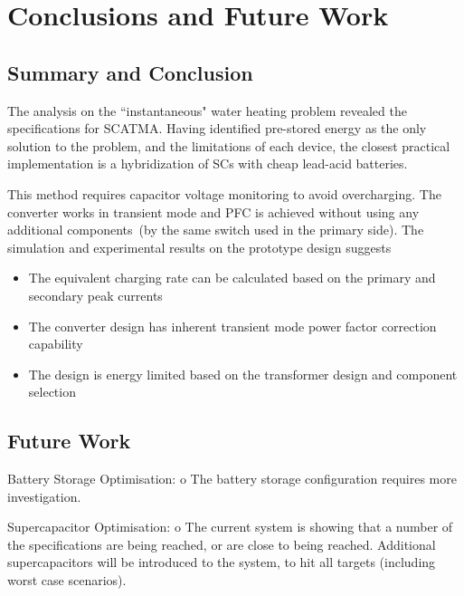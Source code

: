 \chapter{\textbf{Conclusions and Future Work}}
\label{ch:conclude_future}

\section{Summary and Conclusion}

The analysis on the ``instantaneous" water heating problem revealed the specifications for SCATMA.
\noindent Having identified pre-stored energy as the only solution to the problem, and the limitations of each device, the closest practical implementation is a hybridization of SCs with cheap lead-acid batteries. 


This method requires capacitor voltage monitoring to avoid overcharging. The converter works in transient mode and PFC is achieved without using any additional components~(by the same switch used in the primary side). The simulation and experimental results on the prototype design suggests

\begin{itemize}
	\item The equivalent charging rate can be calculated based on the primary and secondary peak currents
	\item The converter design has inherent transient mode power factor correction capability
	\item The design is energy limited based on the transformer design and component selection
\end{itemize}


\section{Future Work}

Battery Storage Optimisation:
o	The battery storage configuration requires more investigation. 

\noindent Supercapacitor Optimisation:
o	The current system is showing that a number of the specifications are being reached, or are close to being reached. Additional supercapacitors will be introduced to the system, to hit all targets (including worst case scenarios). 































